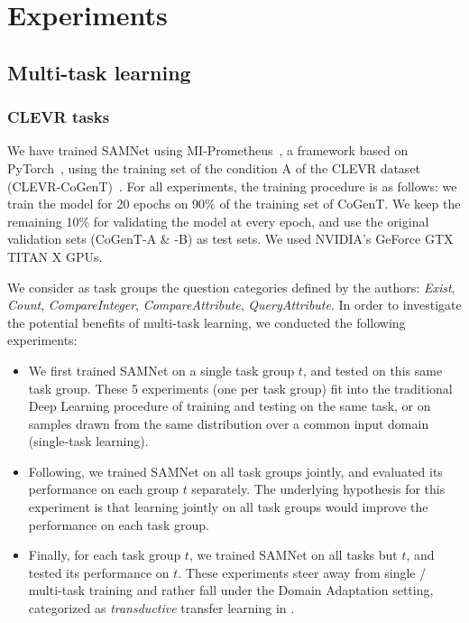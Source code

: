 \section{Experiments}

\subsection{Multi-task learning}

\subsubsection{CLEVR tasks}

We have trained SAMNet using MI-Prometheus~\cite{kornuta2018accelerating}, a framework based on PyTorch~\cite{paszke2017automatic}, using the training set of the condition A of the CLEVR dataset (CLEVR-CoGenT)~\cite{johnson2017clevr}.
For all experiments, the training procedure is as follows: we train the model for 20 epochs on 90\% of the training set of CoGenT. We keep the remaining 10\% for validating the model at every epoch, and use the original validation sets (CoGenT-A  \& -B) as test sets. We used NVIDIA's GeForce GTX TITAN X GPUs.

We consider as task groups the question categories defined by the authors: \textit{Exist}, \textit{Count}, \textit{CompareInteger}, \textit{CompareAttribute}, \textit{QueryAttribute}. In order to investigate the potential benefits of multi-task learning, we conducted the following experiments:

\begin{itemize}
	\item We first trained SAMNet on a single task group $t$, and tested on this same task group. These 5 experiments (one per task group) fit into the traditional Deep Learning procedure of training and testing on the same task, or on samples drawn from the same distribution over a common input domain (single-task learning).
	\item Following, we trained SAMNet on all task groups jointly, and evaluated its performance on each group $t$ separately. The underlying hypothesis for this experiment is that learning jointly on all task groups would improve the performance on each task group.
	\item Finally, for each task group $t$, we trained SAMNet on all tasks but $t$, and tested its performance on $t$. These experiments steer away from single / multi-task training and rather fall under the Domain Adaptation setting, categorized as \emph{transductive} transfer learning in \cite{pan2009survey}.
\end{itemize}

